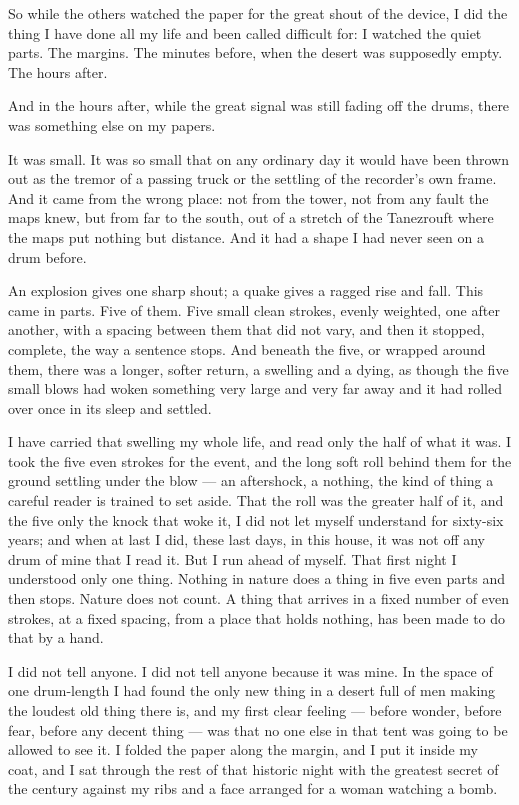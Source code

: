 So while the others watched the paper for the great shout of the device, I did the thing I have done all my life and been called difficult for: I watched the quiet parts. The margins. The minutes before, when the desert was supposedly empty. The hours after.\par

And in the hours after, while the great signal was still fading off the drums, there was something else on my papers.\par

It was small. It was so small that on any ordinary day it would have been thrown out as the tremor of a passing truck or the settling of the recorder's own frame. And it came from the wrong place: not from the tower, not from any fault the maps knew, but from far to the south, out of a stretch of the Tanezrouft where the maps put nothing but distance. And it had a shape I had never seen on a drum before.\par

An explosion gives one sharp shout; a quake gives a ragged rise and fall. This came in parts. Five of them. Five small clean strokes, evenly weighted, one after another, with a spacing between them that did not vary, and then it stopped, complete, the way a sentence stops. And beneath the five, or wrapped around them, there was a longer, softer return, a swelling and a dying, as though the five small blows had woken something very large and very far away and it had rolled over once in its sleep and settled.\par

I have carried that swelling my whole life, and read only the half of what it was. I took the five even strokes for the event, and the long soft roll behind them for the ground settling under the blow --- an aftershock, a nothing, the kind of thing a careful reader is trained to set aside. That the roll was the greater half of it, and the five only the knock that woke it, I did not let myself understand for sixty-six years; and when at last I did, these last days, in this house, it was not off any drum of mine that I read it. But I run ahead of myself. That first night I understood only one thing. Nothing in nature does a thing in five even parts and then stops. Nature does not count. A thing that arrives in a fixed number of even strokes, at a fixed spacing, from a place that holds nothing, has been made to do that by a hand.\par

I did not tell anyone. I did not tell anyone because it was mine. In the space of one drum-length I had found the only new thing in a desert full of men making the loudest old thing there is, and my first clear feeling --- before wonder, before fear, before any decent thing --- was that no one else in that tent was going to be allowed to see it. I folded the paper along the margin, and I put it inside my coat, and I sat through the rest of that historic night with the greatest secret of the century against my ribs and a face arranged for a woman watching a bomb.\par


